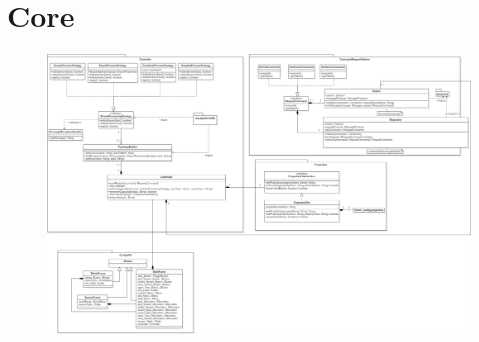 \chapter{Core}
\begin{figure}[!hbp]
	\centering\includegraphics[width=0.8\linewidth]{images/core/CoreClassDiagram}
\end{figure}
